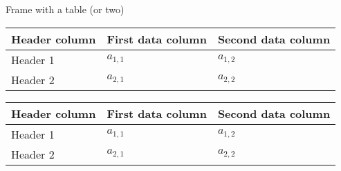 \documentclass[tikz, aspectratio=169]{beamer}
\begin{document}
\begin{frame}{Frame with a table (or two)}
\begin{center}
\begin{tabular}{l | l l }
\toprule
Header column & First data column & Second data column \\
\midrule
Header 1 & \(a_{1,1}\) & \(a_{1,2}\) \\
Header 2 & \(a_{2,1}\) & \(a_{2,2}\) \\
\bottomrule
\end{tabular}
\end{center}
\begin{center}
\begin{tabular}{l | l l }
\toprule
Header column & First data column & Second data column \\
\midrule
Header 1 & \(a_{1,1}\) & \(a_{1,2}\) \\
Header 2 & \(a_{2,1}\) & \(a_{2,2}\) \\
\bottomrule
\end{tabular}
\end{center}
\end{frame}
\end{document}
